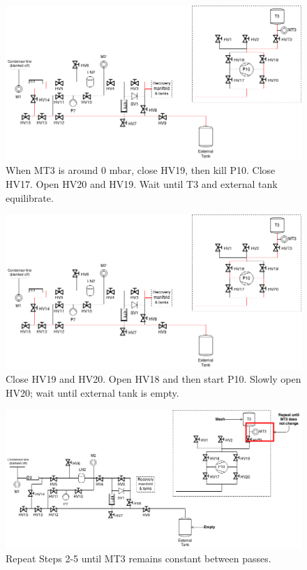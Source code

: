 \documentclass[a4paper,10pt]{article}
\begin{document}
\begin{figure}[htbp!]
 \centering
 \includegraphics[width=\textwidth]{./mash-cleaning-schematic-4-gas-to-t3.png}
 \caption{When MT3 is around 0 mbar, close HV19, then kill P10.  Close HV17.  Open HV20 and HV19.  Wait until T3 and external tank equilibrate.}
 \label{d}
\end{figure}


\begin{figure}[htbp!]
 \centering
 \includegraphics[width=\textwidth]{./mash-cleaning-schematic-5-pump-gas-to-t3.png}
 \caption{Close HV19 and HV20.  Open HV18 and then start P10.  Slowly open HV20; wait until external tank is empty.}
 \label{e}
\end{figure}

\begin{figure}[htbp!]
 \centering
 \includegraphics[width=\textwidth]{./mash-cleaning-schematic-6-repeat.png}
 \caption{Repeat Steps 2-5 until MT3 remains constant between passes.}
 \label{f}
\end{figure}
\end{document}
